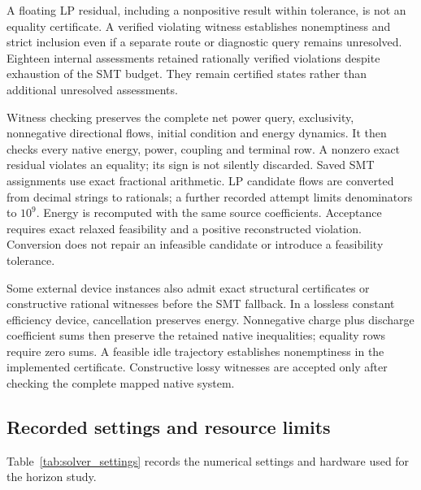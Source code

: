 A floating LP residual, including a nonpositive result within tolerance,
is not an equality certificate. A verified violating witness establishes
nonemptiness and strict inclusion even if a separate route or diagnostic
query remains unresolved. Eighteen internal assessments retained rationally
verified violations despite exhaustion of the SMT budget. They remain
certified states rather than additional unresolved assessments.

Witness checking preserves the complete net power query, exclusivity,
nonnegative directional flows, initial condition and energy dynamics. It
then checks every native energy, power, coupling and terminal row. A nonzero
exact residual violates an equality; its sign is not silently discarded.
Saved SMT assignments use exact fractional arithmetic. LP candidate flows
are converted from decimal strings to rationals; a further recorded attempt
limits denominators to $10^9$. Energy is recomputed with the same source
coefficients. Acceptance requires exact relaxed feasibility and a positive
reconstructed violation. Conversion does not repair an infeasible candidate
or introduce a feasibility tolerance.

Some external device instances also admit exact structural certificates
or constructive rational witnesses before the SMT fallback. In a lossless
constant efficiency device, cancellation preserves energy. Nonnegative
charge plus discharge coefficient sums then preserve the retained native
inequalities; equality rows require zero sums. A feasible idle trajectory
establishes nonemptiness in the implemented certificate. Constructive lossy
witnesses are accepted only after checking the complete mapped native system.

\subsection{Recorded settings and resource limits}
Table~\ref{tab:solver_settings} records the numerical settings and hardware used for the horizon study.

